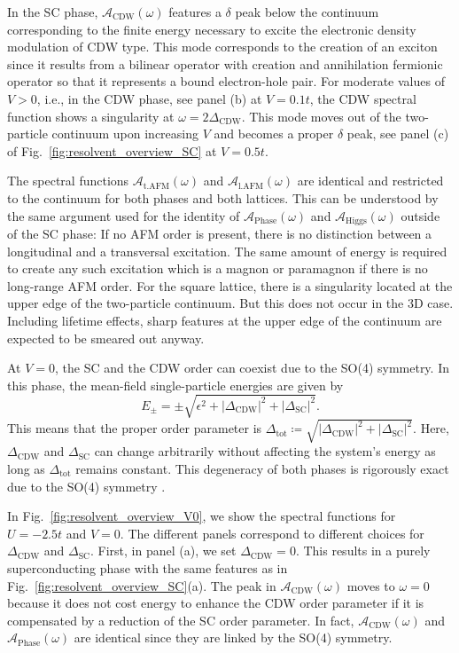 \documentclass[
    reprint, 
    aps,
    preprintnumbers,
    twocolumn,
    prb,
    superscriptaddress
]{revtex4-2}
\newcommand{\spectral}[1]{\mathcal{A}_\text{#1}  (\omega)}
\begin{document}
In the SC phase, $\spectral{CDW}$ features a $\delta$ peak below the continuum corresponding to the finite energy necessary to excite the electronic density modulation of CDW type.
This mode corresponds to the creation of an exciton since it results from a bilinear operator with
creation and annihilation fermionic operator so that it represents a bound electron-hole pair.
For moderate values of $V>0$, i.e., in the CDW phase, see panel (b) at $V=0.1t$, the CDW spectral function 
shows a singularity at $\omega=2\Delta_\text{CDW}$.
This mode moves out of the two-particle continuum upon increasing $V$ 
and becomes a proper $\delta$ peak, see panel (c) of Fig.\ \ref{fig:resolvent_overview_SC} at $V=0.5t$.

The spectral functions $\spectral{t.AFM}$ and $\spectral{l.AFM}$ are identical and restricted to 
the continuum for both phases and both lattices.
This can be understood by the same argument used for the identity of 
$\spectral{Phase}$ and $\spectral{Higgs}$ outside of the SC phase:
If no AFM order is present, there is no distinction between a longitudinal and a transversal excitation. 
The same amount of energy is required to create any such excitation which is a magnon
or paramagnon if there is no long-range AFM order.
For the square lattice, there is a singularity located at the upper edge of the two-particle continuum.
But this does not occur in the 3D case. Including lifetime effects, sharp features at the upper
edge of the continuum are expected to be smeared out anyway.


At $V=0$, the SC and the CDW order can coexist due to the SO(4) symmetry. 
In this phase, the mean-field single-particle energies are given by
\begin{equation}
    E_{\pm} = \pm \sqrt{\epsilon^2 + |\Delta_\text{CDW}|^2 + |\Delta_\text{SC}|^2}.
\end{equation}
This means that the proper order parameter is $\Delta_\text{tot} 
\coloneqq \sqrt{|\Delta_\text{CDW}|^2 + |\Delta_\text{SC}|^2}$.
Here, $\Delta_\text{CDW}$ and $\Delta_\text{SC}$ can change arbitrarily without affecting the system's energy as long as $\Delta_\text{tot}$ remains constant.
This degeneracy of both phases is rigorously exact due to the SO(4) symmetry \cite{yang90}. 

In Fig.\ \ref{fig:resolvent_overview_V0}, we show the spectral functions for $U=-2.5t$ and $V=0$.
The different panels correspond to different choices for $\Delta_\text{CDW}$ and $\Delta_\text{SC}$.
First, in panel (a), we set $\Delta_\text{CDW} = 0$.
This results in a purely superconducting phase with the same features as in 
Fig.\ \ref{fig:resolvent_overview_SC}(a).
The peak in $\spectral{CDW}$ moves to $\omega=0$ because it does not cost energy to enhance the CDW order parameter
if it is compensated by a reduction of the SC order parameter. 
In fact, $\spectral{CDW}$ and $\spectral{Phase}$ are identical since they are linked by the SO(4) symmetry.
\end{document}
